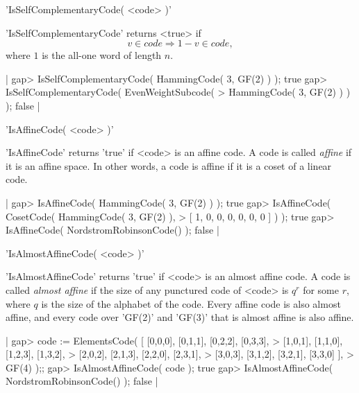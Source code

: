 
'IsSelfComplementaryCode( <code> )'

'IsSelfComplementaryCode' returns <true> if 
\begin{equation}
   v \in code \Rightarrow 1 - v \in code,
\end{equation}
where $1$ is the all-one word of length $n$.

|    gap> IsSelfComplementaryCode( HammingCode( 3, GF(2) ) );
    true
    gap> IsSelfComplementaryCode( EvenWeightSubcode(
    > HammingCode( 3, GF(2) ) ) );
    false |




'IsAffineCode( <code> )'

'IsAffineCode' returns 'true' if <code> is an affine code.
A code is called {\em affine} if it is an affine space.
In other words, a code is affine if it is a coset of a linear code.

|    gap> IsAffineCode( HammingCode( 3, GF(2) ) );
    true
    gap> IsAffineCode( CosetCode( HammingCode( 3, GF(2) ),
    > [ 1, 0, 0, 0, 0, 0, 0 ] ) );
    true
    gap> IsAffineCode( NordstromRobinsonCode() );
    false |




'IsAlmostAffineCode( <code> )'

'IsAlmostAffineCode' returns 'true' if <code> is an almost affine code.
A code is called {\em almost affine} if the size of any punctured code
of <code> is $q^r$ for some $r$, where $q$ is the size of the alphabet
of the code.
Every affine code is also almost affine, and every code over 'GF(2)'
and 'GF(3)' that is almost affine is also affine.

|    gap> code := ElementsCode( [ [0,0,0], [0,1,1], [0,2,2], [0,3,3],
    >                             [1,0,1], [1,1,0], [1,2,3], [1,3,2],
    >                             [2,0,2], [2,1,3], [2,2,0], [2,3,1],
    >                             [3,0,3], [3,1,2], [3,2,1], [3,3,0] ],
    >                             GF(4) );;
    gap> IsAlmostAffineCode( code );
    true 
    gap> IsAlmostAffineCode( NordstromRobinsonCode() );
    false |


